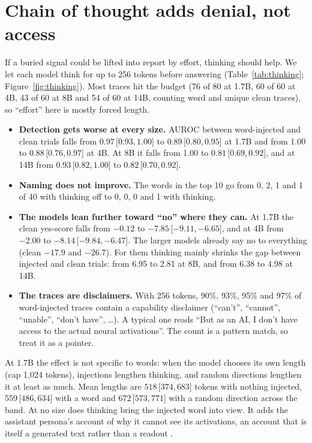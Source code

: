 \documentclass[11pt]{article}
\newcommand{\ci}[3]{\ensuremath{#1}\,[\ensuremath{#2},\allowbreak\,\ensuremath{#3}]}
\newcommand{\ys}{yes-score}
\begin{document}
\section{Chain of thought adds denial, not access}\label{sec:thinking}

If a buried signal could be lifted into report by effort, thinking should help. We let each model think for up to 256 tokens before answering (Table~\ref{tab:thinking}; Figure~\ref{fig:thinking}). Most traces hit the budget (76 of 80 at 1.7B, 60 of 60 at 4B, 43 of 60 at 8B and 54 of 60 at 14B, counting word and unique clean traces), so ``effort'' here is mostly forced length.

\begin{itemize}[leftmargin=*]
  \item \textbf{Detection gets worse at every size.} AUROC between word-injected and clean trials falls from \ci{0.97}{0.93}{1.00} to \ci{0.89}{0.80}{0.95} at 1.7B and from 1.00 to \ci{0.88}{0.76}{0.97} at 4B. At 8B it falls from 1.00 to \ci{0.81}{0.69}{0.92}, and at 14B from \ci{0.93}{0.82}{1.00} to \ci{0.82}{0.70}{0.92}.
  \item \textbf{Naming does not improve.} The words in the top 10 go from 0, 2, 1 and 1 of 40 with thinking off to 0, 0, 0 and 1 with thinking.
  \item \textbf{The models lean further toward ``no'' where they can.} At 1.7B the clean \ys{} falls from $-0.12$ to \ci{-7.85}{-9.11}{-6.65}, and at 4B from $-2.00$ to \ci{-8.14}{-9.84}{-6.47}. The larger models already say no to everything (clean $-17.9$ and $-26.7$). For them thinking mainly shrinks the gap between injected and clean trials: from 6.95 to 2.81 at 8B, and from 6.38 to 4.98 at 14B.
  \item \textbf{The traces are disclaimers.} With 256 tokens, 90\%, 93\%, 95\% and 97\% of word-injected traces contain a capability disclaimer (``can't'', ``cannot'', ``unable'', ``don't have'', \dots). A typical one reads ``But as an AI, I don't have access to the actual neural activations''. The count is a pattern match, so treat it as a pointer.
\end{itemize}
At 1.7B the effect is not specific to words: when the model chooses its own length (cap 1,024 tokens), injections lengthen thinking, and random directions lengthen it at least as much. Mean lengths are \ci{518}{374}{683} tokens with nothing injected, \ci{559}{486}{634} with a word and \ci{672}{573}{771} with a random direction across the band. At no size does thinking bring the injected word into view. It adds the assistant persona's account of why it cannot see its activations, an account that is itself a generated text rather than a readout \citep{turpin2023unfaithful}.
\end{document}
